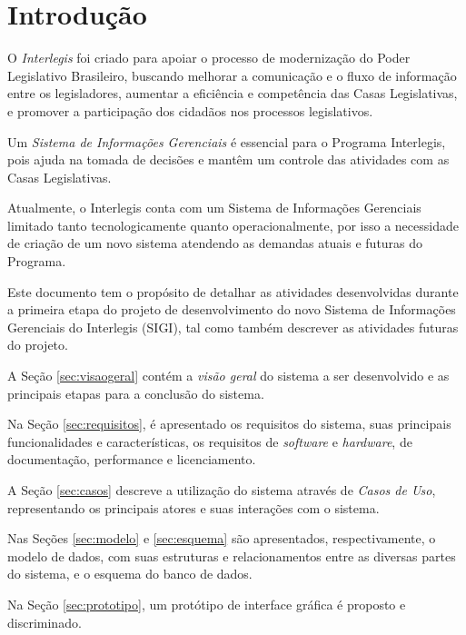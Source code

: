 %
%

\section{Introdução}
O \emph{Interlegis} foi criado para apoiar o processo de modernização
do Poder Legislativo Brasileiro, buscando melhorar a comunicação e o
fluxo de informação entre os legisladores, aumentar a eficiência e
competência das Casas Legislativas, e promover a participação dos
cidadãos nos processos legislativos.

Um \emph{Sistema de Informações Gerenciais} é essencial para o
Programa Interlegis, pois ajuda na tomada de decisões e mantêm um
controle das atividades com as Casas Legislativas.

Atualmente, o Interlegis conta com um Sistema de Informações
Gerenciais limitado tanto tecnologicamente quanto operacionalmente,
por isso a necessidade de criação de um novo sistema atendendo as
demandas atuais e futuras do Programa.

Este documento tem o propósito de detalhar as atividades desenvolvidas
durante a primeira etapa do projeto de desenvolvimento do novo Sistema
de Informações Gerenciais do Interlegis (SIGI), tal como também
descrever as atividades futuras do projeto.

A Seção \ref{sec:visaogeral} contém a \emph{visão geral} do sistema a
ser desenvolvido e as principais etapas para a conclusão do sistema.

Na Seção \ref{sec:requisitos}, é apresentado os requisitos do sistema,
suas principais funcionalidades e características, os requisitos de
\textit{software} e \textit{hardware}, de documentação, performance e
licenciamento.

A Seção \ref{sec:casos} descreve a utilização do sistema através de
\emph{Casos de Uso}, representando os principais atores e suas
interações com o sistema.

Nas Seções \ref{sec:modelo} e \ref{sec:esquema} são apresentados,
respectivamente, o modelo de dados, com suas estruturas e
relacionamentos entre as diversas partes do sistema, e o esquema do
banco de dados.

Na Seção \ref{sec:prototipo}, um protótipo de interface gráfica é
proposto e discriminado.

